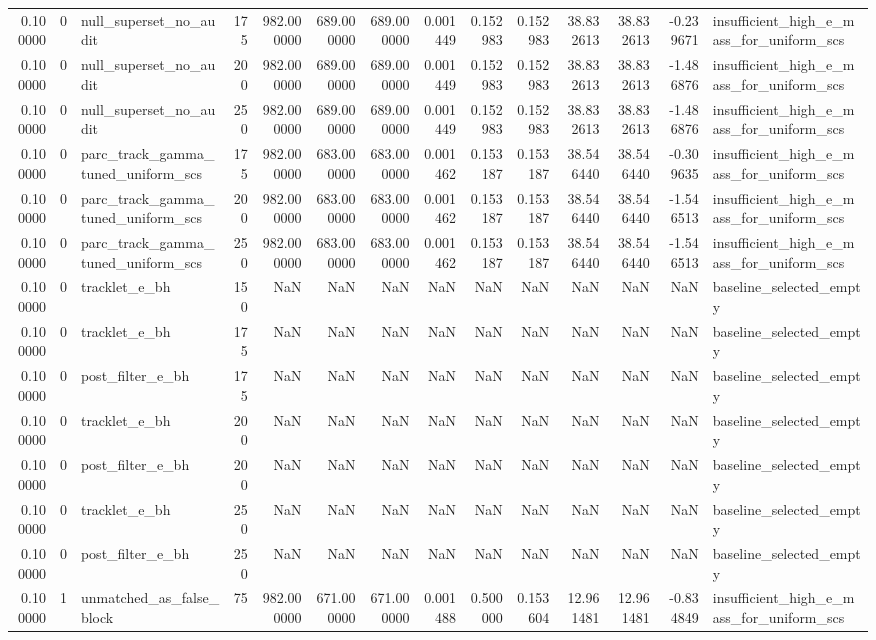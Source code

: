 \begin{tabular}{rrlrrrrrrrrrrl}
0.100000 & 0 & null_superset_no_audit & 175 & 982.000000 & 689.000000 & 689.000000 & 0.001449 & 0.152983 & 0.152983 & 38.832613 & 38.832613 & -0.239671 & insufficient_high_e_mass_for_uniform_scs \\
0.100000 & 0 & null_superset_no_audit & 200 & 982.000000 & 689.000000 & 689.000000 & 0.001449 & 0.152983 & 0.152983 & 38.832613 & 38.832613 & -1.486876 & insufficient_high_e_mass_for_uniform_scs \\
0.100000 & 0 & null_superset_no_audit & 250 & 982.000000 & 689.000000 & 689.000000 & 0.001449 & 0.152983 & 0.152983 & 38.832613 & 38.832613 & -1.486876 & insufficient_high_e_mass_for_uniform_scs \\
0.100000 & 0 & parc_track_gamma_tuned_uniform_scs & 175 & 982.000000 & 683.000000 & 683.000000 & 0.001462 & 0.153187 & 0.153187 & 38.546440 & 38.546440 & -0.309635 & insufficient_high_e_mass_for_uniform_scs \\
0.100000 & 0 & parc_track_gamma_tuned_uniform_scs & 200 & 982.000000 & 683.000000 & 683.000000 & 0.001462 & 0.153187 & 0.153187 & 38.546440 & 38.546440 & -1.546513 & insufficient_high_e_mass_for_uniform_scs \\
0.100000 & 0 & parc_track_gamma_tuned_uniform_scs & 250 & 982.000000 & 683.000000 & 683.000000 & 0.001462 & 0.153187 & 0.153187 & 38.546440 & 38.546440 & -1.546513 & insufficient_high_e_mass_for_uniform_scs \\
0.100000 & 0 & tracklet_e_bh & 150 & NaN & NaN & NaN & NaN & NaN & NaN & NaN & NaN & NaN & baseline_selected_empty \\
0.100000 & 0 & tracklet_e_bh & 175 & NaN & NaN & NaN & NaN & NaN & NaN & NaN & NaN & NaN & baseline_selected_empty \\
0.100000 & 0 & post_filter_e_bh & 175 & NaN & NaN & NaN & NaN & NaN & NaN & NaN & NaN & NaN & baseline_selected_empty \\
0.100000 & 0 & tracklet_e_bh & 200 & NaN & NaN & NaN & NaN & NaN & NaN & NaN & NaN & NaN & baseline_selected_empty \\
0.100000 & 0 & post_filter_e_bh & 200 & NaN & NaN & NaN & NaN & NaN & NaN & NaN & NaN & NaN & baseline_selected_empty \\
0.100000 & 0 & tracklet_e_bh & 250 & NaN & NaN & NaN & NaN & NaN & NaN & NaN & NaN & NaN & baseline_selected_empty \\
0.100000 & 0 & post_filter_e_bh & 250 & NaN & NaN & NaN & NaN & NaN & NaN & NaN & NaN & NaN & baseline_selected_empty \\
0.100000 & 1 & unmatched_as_false_block & 75 & 982.000000 & 671.000000 & 671.000000 & 0.001488 & 0.500000 & 0.153604 & 12.961481 & 12.961481 & -0.834849 & insufficient_high_e_mass_for_uniform_scs \\

\end{tabular}
